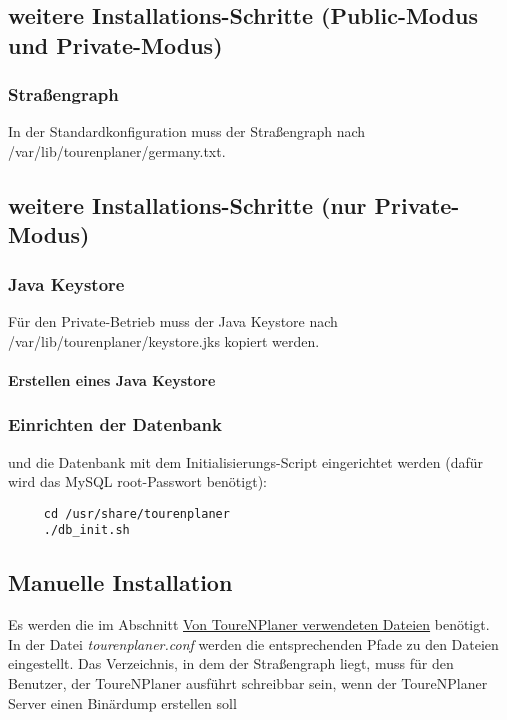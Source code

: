 \documentclass[ngerman,titlepage,parskip=true]{scrartcl}
\begin{document}
	\subsection{weitere Installations-Schritte (Public-Modus und Private-Modus)}
	\subsubsection{Stra\ss{}engraph}
	 In der Standardkonfiguration muss der Stra\ss{}engraph nach /var/lib/tourenplaner/germany.txt.
	\subsection{weitere Installations-Schritte (nur Private-Modus)}
	 \subsubsection{Java Keystore}
	 F\"ur den Private-Betrieb muss der Java Keystore nach /var/lib/tourenplaner/keystore.jks kopiert werden.
	 \paragraph{Erstellen eines Java Keystore}
	\subsubsection{Einrichten der Datenbank}
	und die Datenbank mit dem Initialisierungs-Script eingerichtet werden (daf\"ur wird das MySQL root-Passwort ben\"otigt):
   \begin{lstlisting}
	 cd /usr/share/tourenplaner
	 ./db_init.sh
	\end{lstlisting}
	
  \subsection{Manuelle Installation}
	Es werden die im Abschnitt \hyperref[usedfiles]{Von ToureNPlaner verwendeten Dateien} ben\"otigt.\\
	In der Datei \textit{tourenplaner.conf} werden die entsprechenden Pfade zu den Dateien eingestellt. Das Verzeichnis, in dem der Stra\ss{}engraph liegt, muss f\"ur den Benutzer, der ToureNPlaner ausf\"uhrt schreibbar sein, wenn der ToureNPlaner Server einen Bin\"ardump erstellen soll
\end{document}
